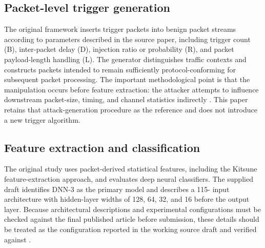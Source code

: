 \documentclass[11pt]{article}
\begin{document}
\subsection{Packet-level trigger generation}
The original framework inserts trigger packets into benign packet streams according to parameters described in the source paper, including trigger count (B), inter-packet delay (D), injection ratio or probability (R), and packet payload-length handling (L). The generator distinguishes traffic contexts and constructs packets intended to remain sufficiently protocol-conforming for subsequent packet processing. The important methodological point is that the manipulation occurs before feature extraction: the attacker attempts to influence downstream packet-size, timing, and channel statistics indirectly \cite{ref1}. This paper retains that attack-generation procedure as the reference and does not introduce a new trigger algorithm.

\subsection{Feature extraction and classification}
The original study uses packet-derived statistical features, including the Kitsune feature-extraction approach, and evaluates deep neural classifiers. The supplied draft identifies DNN-3 as the primary model and describes a 115- input architecture with hidden-layer widths of 128, 64, 32, and 16 before the output layer. Because architectural descriptions and experimental configurations must be checked against the final published article before submission, these details should be treated as the configuration reported in the working source draft and verified against \cite{ref1}.
\end{document}
